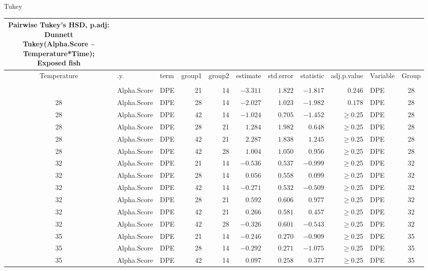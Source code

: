 \documentclass[
]{article}
\begin{document}
Tukey

\begin{longtable}{cllrrrrrrlc}
\caption*{
{\large Pairwise Tukey's HSD, p.adj: Dunnett} \\ 
{\small Tukey(Alpha.Score \textasciitilde{} Temperature*Time); Exposed fish}
} \\ 
\toprule
Temperature & .y. & term & group1 & group2 & estimate & std.error & statistic & adj.p.value & Variable & Group \\ 
\midrule\addlinespace[2.5pt]
\multicolumn{11}{l}{Shannon} \\ 
\midrule\addlinespace[2.5pt]
28 & Alpha.Score & DPE & 21 & 14 & $-3.311$ & $1.822$ & $-1.817$ & $0.246$ & DPE & 28 \\ 
28 & Alpha.Score & DPE & 28 & 14 & $-2.027$ & $1.023$ & $-1.982$ & $0.178$ & DPE & 28 \\ 
28 & Alpha.Score & DPE & 42 & 14 & $-1.024$ & $0.705$ & $-1.452$ & $\geq$0.25 & DPE & 28 \\ 
28 & Alpha.Score & DPE & 28 & 21 & $1.284$ & $1.982$ & $0.648$ & $\geq$0.25 & DPE & 28 \\ 
28 & Alpha.Score & DPE & 42 & 21 & $2.287$ & $1.838$ & $1.245$ & $\geq$0.25 & DPE & 28 \\ 
28 & Alpha.Score & DPE & 42 & 28 & $1.004$ & $1.050$ & $0.956$ & $\geq$0.25 & DPE & 28 \\ 
32 & Alpha.Score & DPE & 21 & 14 & $-0.536$ & $0.537$ & $-0.999$ & $\geq$0.25 & DPE & 32 \\ 
32 & Alpha.Score & DPE & 28 & 14 & $0.056$ & $0.558$ & $0.099$ & $\geq$0.25 & DPE & 32 \\ 
32 & Alpha.Score & DPE & 42 & 14 & $-0.271$ & $0.532$ & $-0.509$ & $\geq$0.25 & DPE & 32 \\ 
32 & Alpha.Score & DPE & 28 & 21 & $0.592$ & $0.606$ & $0.977$ & $\geq$0.25 & DPE & 32 \\ 
32 & Alpha.Score & DPE & 42 & 21 & $0.266$ & $0.581$ & $0.457$ & $\geq$0.25 & DPE & 32 \\ 
32 & Alpha.Score & DPE & 42 & 28 & $-0.326$ & $0.601$ & $-0.543$ & $\geq$0.25 & DPE & 32 \\ 
35 & Alpha.Score & DPE & 21 & 14 & $-0.246$ & $0.270$ & $-0.909$ & $\geq$0.25 & DPE & 35 \\ 
35 & Alpha.Score & DPE & 28 & 14 & $-0.292$ & $0.271$ & $-1.075$ & $\geq$0.25 & DPE & 35 \\ 
35 & Alpha.Score & DPE & 42 & 14 & $0.097$ & $0.258$ & $0.377$ & $\geq$0.25 & DPE & 35 \\ 

\end{longtable}
\end{document}
